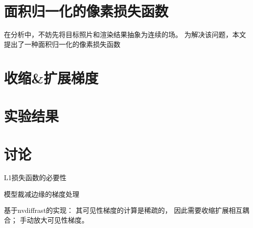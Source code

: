 \section{面积归一化的像素损失函数}

在分析中，不妨先将目标照片和渲染结果抽象为连续的场。
为解决该问题，本文提出了一种面积归一化的像素损失函数

\section{收缩\&扩展梯度}

\section{实验结果}

\section{讨论}

L1损失函数的必要性

模型裁减边缘的梯度处理

基于nvdiffrast\citep{nvdiffrast}的实现：
其可见性梯度的计算是稀疏的，
因此需要收缩扩展相互耦合；
手动放大可见性梯度。
